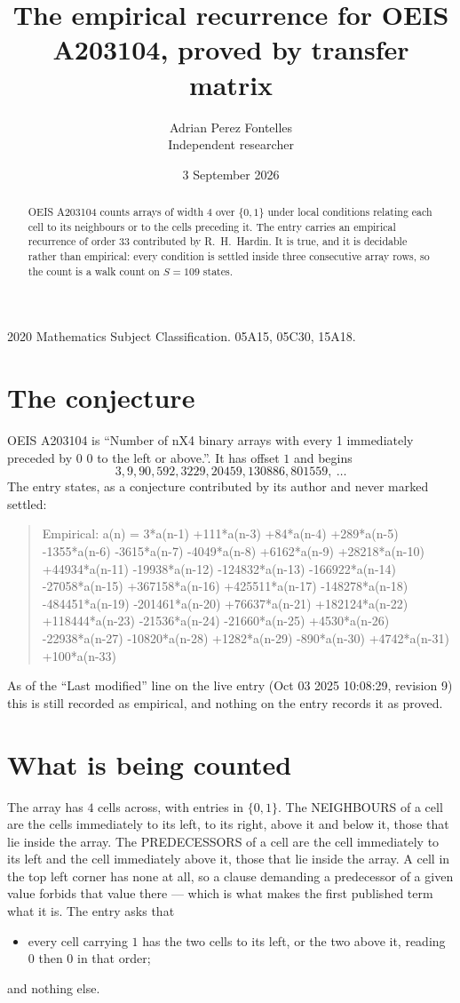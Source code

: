 \documentclass[11pt,a4paper]{article}
\title{The empirical recurrence for OEIS A203104, proved by transfer matrix}
\author{Adrian Perez Fontelles\\ \small Independent researcher}
\date{3 September 2026}
\theoremstyle{plain}
\theoremstyle{definition}
\begin{document}
\maketitle

\begin{abstract}
OEIS A203104 counts arrays of width $4$ over $\{0,1\}$ under local conditions relating each cell
to its neighbours or to the cells preceding it. The entry carries an empirical recurrence of
order $33$ contributed by R.~H.~Hardin. It is true, and it is decidable rather than
empirical: every condition is settled inside three consecutive array rows, so the count is a
walk count on $S=109$ states.
\end{abstract}

\noindent\small 2020 Mathematics Subject Classification. 05A15, 05C30, 15A18.\normalsize

\section{The conjecture}

OEIS A203104 is ``Number of nX4 binary arrays with every 1 immediately preceded by 0 0 to the left or above.''. It has offset $1$ and begins
\[
3, 9, 90, 592, 3229, 20459, 130886, 801559,\ \dots
\]
The entry states, as a conjecture contributed by its author and never marked settled:
\begin{quote}
Empirical: a(n) = 3*a(n-1) +111*a(n-3) +84*a(n-4) +289*a(n-5) -1355*a(n-6) -3615*a(n-7) -4049*a(n-8) +6162*a(n-9) +28218*a(n-10) +44934*a(n-11) -19938*a(n-12) -124832*a(n-13) -166922*a(n-14) -27058*a(n-15) +367158*a(n-16) +425511*a(n-17) -148278*a(n-18) -484451*a(n-19) -201461*a(n-20) +76637*a(n-21) +182124*a(n-22) +118444*a(n-23) -21536*a(n-24) -21660*a(n-25) +4530*a(n-26) -22938*a(n-27) -10820*a(n-28) +1282*a(n-29) -890*a(n-30) +4742*a(n-31) +100*a(n-33)
\end{quote}
As of the ``Last modified'' line on the live entry (Oct 03 2025 10:08:29, revision 9) this is still
recorded as empirical, and nothing on the entry records it as proved.

\section{What is being counted}

The array has $4$ cells across, with entries in $\{0,1\}$. The NEIGHBOURS of a cell are the
cells immediately to its left, to its right, above it and below it, those that lie inside the
array. The PREDECESSORS of a cell are the cell immediately to its left and the cell
immediately above it, those that lie inside the array. A cell in the top left corner has none
at all, so a clause demanding a predecessor of a given value forbids that value there --- which
is what makes the first published term what it is. The entry asks that
\begin{itemize}
\item every cell carrying $1$ has the two cells to its left, or the two above it, reading $0$ then $0$ in that order;
\end{itemize}
and nothing else.
\end{document}
